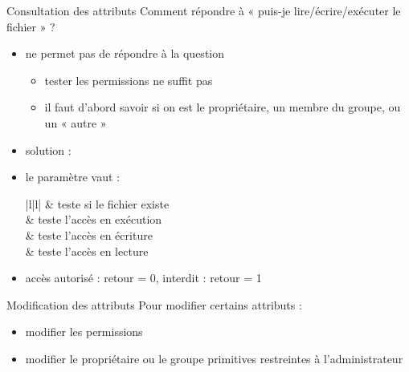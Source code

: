 \begin {frame} {Consultation des attributs}
    Comment répondre à « puis-je lire/écrire/exécuter le fichier » ?

    \begin {itemize}
	\item {} ne permet pas de répondre à la question
	    \begin {itemize}
		\item tester les permissions ne suffit pas
		\item il faut d'abord savoir si on est le propriétaire,
		    un membre du groupe, ou un « autre »
	    \end {itemize}

	\item solution :


	\item le paramètre  vaut :

	    \ctableau {\fC} {|l|l|} {
		\rc {} & teste si le fichier existe \\
		\rc {} & teste l'accès en exécution \\
		\rc {} & teste l'accès en écriture \\
		\rc {} & teste l'accès en lecture \\
	    }

	\item accès autorisé : retour = 0, interdit : retour = 1

    \end {itemize}
\end {frame}

\begin {frame} {Modification des attributs}
    Pour modifier certains attributs :
    \begin {itemize}
	\item modifier les permissions

	\item modifier le propriétaire ou le groupe
	    \vspace* {-4mm}
	    \implique primitives restreintes à l'administrateur
    \end {itemize}
\end {frame}

